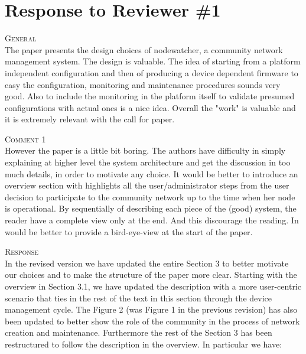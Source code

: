 \documentclass[12pt,twoside,a4paper]{report}
\begin{document}
\section*{Response to Reviewer \#1}

\vspace{0.5cm}\noindent\textsc{General}\\
\noindent The paper presents  the design choices of nodewatcher, a community network management system. The design is valuable. The idea of starting from a platform independent configuration and then of producing a device dependent firmware to easy the configuration, monitoring and maintenance procedures sounds very good. Also to include the monitoring in the platform itself to validate presumed configurations with actual ones is a nice idea.
Overall the "work" is valuable and it is extremely relevant with the call for paper.

\vspace{0.5cm}\noindent\textsc{Comment 1}\\
However the paper is a little bit boring. The authors have difficulty in simply explaining at higher level the system architecture and get the discussion in too much details, in order to motivate any choice. It would be better to introduce an overview section with highlights all the user/administrator steps from the user decision to participate to the community network up to the time when her node is operational. By sequentially of describing each piece of the (good) system, the reader have a complete view only at the end. And this discourage the reading. In would be better to provide a bird-eye-view at the start of the paper. 

\vspace{0.2cm}\noindent\textsc{Response}\\
In the revised version we have updated the entire Section 3 to better motivate our choices and to make the structure of the paper more clear. Starting with the overview in Section 3.1, we have updated the description with a more user-centric scenario that ties in the rest of the text in this section through the device management cycle.
The Figure 2 (was Figure 1 in the previous revision) has also been updated to better show the role of the community in the process of network creation and maintenance. Furthermore the rest of the Section 3 has been restructured to follow the description in the overview. In particular we have:
\end{document}
